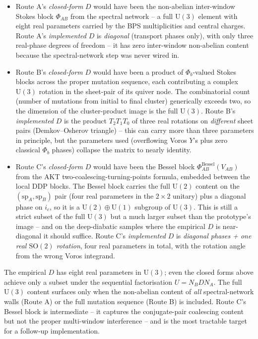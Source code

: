 \documentclass[11pt]{article}
\begin{document}
\begin{itemize}
 \item Route A's \emph{closed-form} $D$ would have been the non-abelian
 inter-window Stokes block $\Phi_{AB}$ from the spectral network
 -- a full $\mathrm U(3)$ element with eight real parameters carried
 by the BPS multiplicities and central charges. Route A's
 \emph{implemented} $D$ is \emph{diagonal} (transport phases only),
 with only three real-phase degrees of freedom -- it has zero
 inter-window non-abelian content because the spectral-network step
 was never wired in.
 \item Route B's \emph{closed-form} $D$ would have been a product of
 $\Phi_b$-valued Stokes blocks across the proper mutation sequence,
 each contributing a complex $\mathrm U(3)$ rotation in the
 sheet-pair of its quiver node. The combinatorial count (number of
 mutations from initial to final cluster) generically exceeds two,
 so the dimension of the cluster-product image is the full
 $\mathrm U(3)$. Route B's \emph{implemented} $D$ is the product
 $T_2 T_1 T_0$ of three real rotations on \emph{different} sheet
 pairs (Demkov--Osherov triangle) -- this can carry more than three
 parameters in principle, but the parameters used (overflowing
 Voros $Y$'s plus zero classical $\Phi_b$ phases) collapse the
 matrix to nearly identity.
 \item Route C's \emph{closed-form} $D$ would have been the Bessel
 block $\Phi_{AB}^{\text{Bessel}}(V_{AB})$ from the AKT
 two-coalescing-turning-points formula, embedded between the local
 DDP blocks. The Bessel block carries the full $\mathrm U(2)$
 content on the $(\mathrm{sp}_A, \mathrm{sp}_B)$ pair (four real
 parameters in the $2\times2$ unitary) plus a diagonal phase on
 $i_c$, so it is a $\mathrm U(2)\oplus\mathrm U(1)$ subgroup of
 $\mathrm U(3)$. This is still a strict subset of the full
 $\mathrm U(3)$ but a much larger subset than the prototype's image
 -- and on the deep-diabatic samples where the empirical $D$ is
 near-diagonal it should suffice. Route C's \emph{implemented} $D$
 is \emph{diagonal phases + one real $\mathrm{SO}(2)$ rotation},
 four real parameters in total, with the rotation angle from the
 wrong Voros integrand.
\end{itemize}

The empirical $D$ has eight real parameters in $\mathrm U(3)$;
even the closed forms above achieve only a subset under the
sequential factorisation $U=N_B D N_A$. The full $\mathrm U(3)$
content surfaces only when the non-abelian content of \emph{all}
spectral-network walls (Route A) or the full mutation sequence
(Route B) is included. Route C's Bessel block is intermediate -- it
captures the conjugate-pair coalescing content but not the proper
multi-window interference -- and is the most tractable target for a
follow-up implementation.
\end{document}

